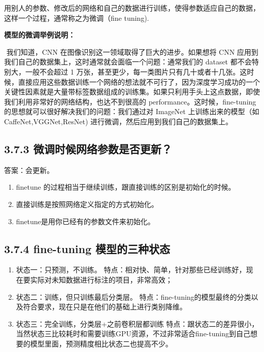 ​
用别人的参数、修改后的网络和自己的数据进行训练，使得参数适应自己的数据，这样一个过程，通常称之为微调（fine
tuning).

\textbf{模型的微调举例说明：}

​ 我们知道，CNN 在图像识别这一领域取得了巨大的进步。如果想将 CNN
应用到我们自己的数据集上，这时通常就会面临一个问题：通常我们的 dataset
都不会特别大，一般不会超过 1
万张，甚至更少，每一类图片只有几十或者十几张。这时候，直接应用这些数据训练一个网络的想法就不可行了，因为深度学习成功的一个关键性因素就是大量带标签数据组成的训练集。如果只利用手头上这点数据，即使我们利用非常好的网络结构，也达不到很高的
performance。这时候，fine-tuning
的思想就可以很好解决我们的问题：我们通过对 ImageNet
上训练出来的模型（如CaffeNet,VGGNet,ResNet)
进行微调，然后应用到我们自己的数据集上。

\subsection{3.7.3
微调时候网络参数是否更新？}\label{ux5faeux8c03ux65f6ux5019ux7f51ux7edcux53c2ux6570ux662fux5426ux66f4ux65b0}

答案：会更新。

\begin{enumerate}
\def\labelenumi{\arabic{enumi}.}
 
\item
  finetune 的过程相当于继续训练，跟直接训练的区别是初始化的时候。
\item
  直接训练是按照网络定义指定的方式初始化。
\item
  finetune是用你已经有的参数文件来初始化。
\end{enumerate}

\subsection{3.7.4 fine-tuning
模型的三种状态}\label{fine-tuning-ux6a21ux578bux7684ux4e09ux79cdux72b6ux6001}

\begin{enumerate}
\def\labelenumi{\arabic{enumi}.}
\item
  状态一：只预测，不训练。
  特点：相对快、简单，针对那些已经训练好，现在要实际对未知数据进行标注的项目，非常高效；
\item
  状态二：训练，但只训练最后分类层。
  特点：fine-tuning的模型最终的分类以及符合要求，现在只是在他们的基础上进行类别降维。
\item
  状态三：完全训练，分类层+之前卷积层都训练
  特点：跟状态二的差异很小，当然状态三比较耗时和需要训练GPU资源，不过非常适合fine-tuning到自己想要的模型里面，预测精度相比状态二也提高不少。
\end{enumerate}

